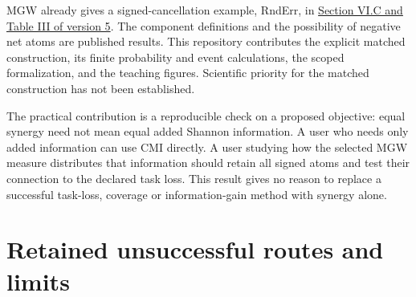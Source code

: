 MGW already gives a signed-cancellation example, RndErr, in \href{https://arxiv.org/pdf/2002.03356v5\#page=11}{Section VI.C and Table III of version 5}. The component definitions and the possibility of negative net atoms are published results. This repository contributes the explicit matched construction, its finite probability and event calculations, the scoped formalization, and the teaching figures. Scientific priority for the matched construction has not been established.

The practical contribution is a reproducible check on a proposed objective: equal synergy need not mean equal added Shannon information. A user who needs only added information can use CMI directly. A user studying how the selected MGW measure distributes that information should retain all signed atoms and test their connection to the declared task loss. This result gives no reason to replace a successful task-loss, coverage or information-gain method with synergy alone.

\par{}

\section{Retained unsuccessful routes and limits}\label{retained-unsuccessful-routes-and-limits}

